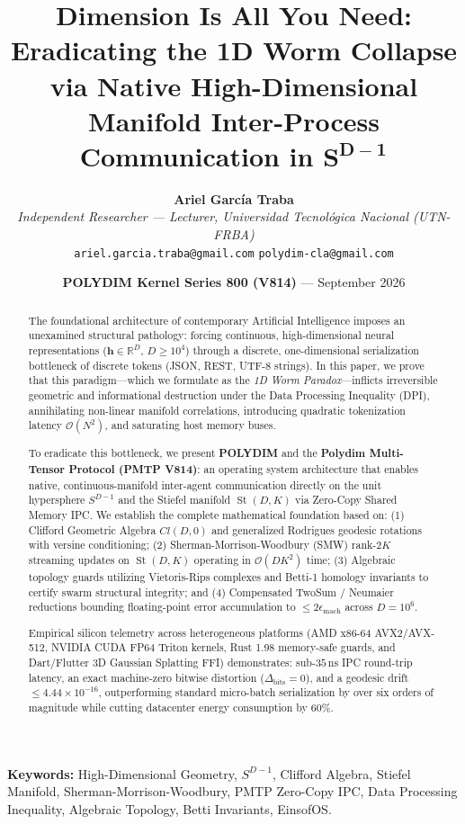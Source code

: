 \documentclass[11pt,twoside,a4paper]{article}
\title{\LARGE \textbf{Dimension Is All You Need:}\\[0.3em]
\Large \textbf{Eradicating the 1D Worm Collapse via Native High-Dimensional Manifold Inter-Process Communication in $\boldsymbol{S^{D-1}}$}}
\author{
  \textbf{Ariel García Traba}\\[0.2em]
  \textit{Independent Researcher --- Lecturer, Universidad Tecnol\'ogica Nacional (UTN-FRBA)}\\[0.1em]
  \texttt{ariel.garcia.traba@gmail.com} \quad \texttt{polydim-cla@gmail.com}
}
\date{\textbf{POLYDIM Kernel Series 800 (V814)} --- September 2026}
\theoremstyle{plain}
\theoremstyle{definition}
\theoremstyle{remark}
\newcommand{\R}{\mathbb{R}}
\newcommand{\St}{\operatorname{St}}
\begin{document}
\maketitle

\begin{abstract}
The foundational architecture of contemporary Artificial Intelligence imposes an unexamined structural pathology: forcing continuous, high-dimensional neural representations ($\mathbf{h} \in \R^D$, $D \ge 10^4$) through a discrete, one-dimensional serialization bottleneck of discrete tokens (JSON, REST, UTF-8 strings). In this paper, we prove that this paradigm---which we formulate as the \textit{1D Worm Paradox}---inflicts irreversible geometric and informational destruction under the Data Processing Inequality (DPI), annihilating non-linear manifold correlations, introducing quadratic tokenization latency $\mathcal{O}(N^2)$, and saturating host memory buses.

To eradicate this bottleneck, we present \textbf{POLYDIM} and the \textbf{Polydim Multi-Tensor Protocol (PMTP V814)}: an operating system architecture that enables native, continuous-manifold inter-agent communication directly on the unit hypersphere $S^{D-1}$ and the Stiefel manifold $\St(D, K)$ via Zero-Copy Shared Memory IPC. We establish the complete mathematical foundation based on: (1) Clifford Geometric Algebra $Cl(D, 0)$ and generalized Rodrigues geodesic rotations with versine conditioning; (2) Sherman-Morrison-Woodbury (SMW) rank-$2K$ streaming updates on $\St(D, K)$ operating in $\mathcal{O}(DK^2)$ time; (3) Algebraic topology guards utilizing Vietoris-Rips complexes and Betti-1 homology invariants to certify swarm structural integrity; and (4) Compensated TwoSum / Neumaier reductions bounding floating-point error accumulation to $\le 2\epsilon_{\text{mach}}$ across $D = 10^6$.

Empirical silicon telemetry across heterogeneous platforms (AMD x86-64 AVX2/AVX-512, NVIDIA CUDA FP64 Triton kernels, Rust 1.98 memory-safe guards, and Dart/Flutter 3D Gaussian Splatting FFI) demonstrates: sub-$35\,\text{ns}$ IPC round-trip latency, an exact machine-zero bitwise distortion ($\Delta_{\text{bits}} = 0$), and a geodesic drift $\le 4.44 \times 10^{-16}$, outperforming standard micro-batch serialization by over six orders of magnitude while cutting datacenter energy consumption by $60\%$.
\end{abstract}

\vspace{0.8cm}
\noindent\textbf{Keywords:} High-Dimensional Geometry, $S^{D-1}$, Clifford Algebra, Stiefel Manifold, Sherman-Morrison-Woodbury, PMTP Zero-Copy IPC, Data Processing Inequality, Algebraic Topology, Betti Invariants, EinsofOS.
\end{document}
